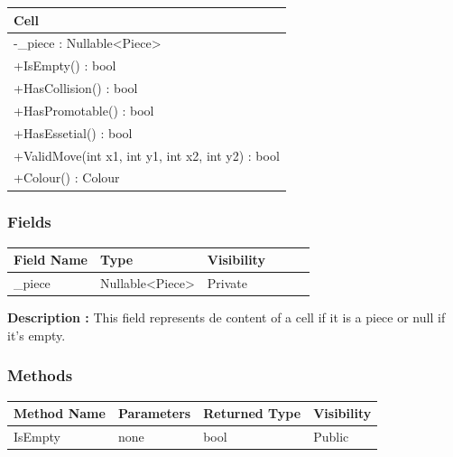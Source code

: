 \documentclass[12pt]{article}
\begin{document}
\begin{table}[H]
    \begin{tabular}{|l|}
    \hline
    \rowcolor[HTML]{C0C0C0} 
    \textbf{Cell}                                    \\ \hline
    \rowcolor[HTML]{EFEFEF}
    -\_piece : Nullable\textless{}Piece\textgreater{}                        \\ \hline
    +IsEmpty() : bool                                 \\ \hline
    +HasCollision() : bool                            \\ \hline
    +HasPromotable() : bool                           \\ \hline
    +HasEssetial() : bool                             \\ \hline
    +ValidMove(int x1, int y1, int x2, int y2) : bool \\ \hline
    +Colour() : Colour                                \\ \hline
    \end{tabular}
\end{table}

\subsubsection{Fields}

\begin{table}[H]
    \begin{tabular}{llllll}
    \hline
    \multicolumn{1}{|l|}{\cellcolor[HTML]{EFEFEF}\textbf{Field Name}} & \multicolumn{1}{l|}{\cellcolor[HTML]{EFEFEF}\textbf{Type}} & \multicolumn{1}{l|}{\cellcolor[HTML]{EFEFEF}\textbf{Visibility}} \\ \hline
    \multicolumn{1}{|l|}{\_piece}                                     & \multicolumn{1}{l|}{Nullable\textless{}Piece\textgreater{}}                       & \multicolumn{1}{l|}{Private}                                     \\ \hline
    \end{tabular}
\end{table}

\textbf{Description :} This field represents de content of a cell if it is a piece
or null if it's empty.

\subsubsection{Methods}

\begin{table}[H]
    \begin{tabular}{|l|l|l|l|}
    \hline
    \rowcolor[HTML]{EFEFEF} 
    \cellcolor[HTML]{EFEFEF}\textbf{Method Name} & \textbf{Parameters}    & \textbf{Returned Type} & \textbf{Visibility} \\ \hline
    IsEmpty                                      & none                   & bool                   & Public              \\ \hline
    \end{tabular}
\end{table}
\end{document}

